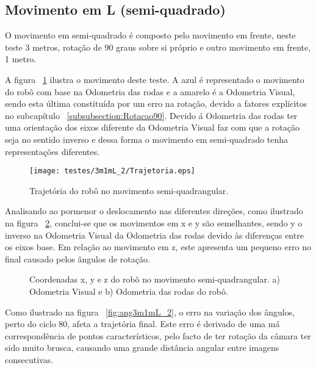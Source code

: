 \FloatBarrier
\subsection{Movimento em L (semi-quadrado)}\label{subsubsection:L}


O movimento em semi-quadrado é composto pelo movimento em frente, neste teste 3 metros, rotação de 90 graus sobre si próprio e outro movimento em frente, 1 metro.

A figura ~\ref{fig:trajRobo3m1mL_2} ilustra o movimento deste teste. A  azul é representado o movimento do robô com base na Odometria das rodas e a amarelo é a Odometria Visual, sendo esta última constituída por um erro na rotação, devido a fatores explícitos no subcapítulo ~\ref{subsubsection:Rotacao90}. Devido á Odometria das rodas ter uma orientação dos eixos diferente da Odometria Visual faz com que a rotação seja no sentido inverso e dessa forma o movimento em semi-quadrado tenha representações diferentes.

\pagebreak

\begin{figure}[h!]
	\begin{center}
		\leavevmode		
		\texttt{[image: testes/3m1mL\_2/Trajetoria.eps]}
		\caption{Trajetória do robô no movimento semi-quadrangular.}
		\label{fig:trajRobo3m1mL_2}
	\end{center}
\end{figure}



Analisando ao pormenor o deslocamento nas diferentes direções, como ilustrado na figura ~\ref{fig:pos3m1mL_2}, conclui-se que os movimentos em x e y são semelhantes, sendo y o inverso na Odometria Visual da Odometria das rodas devido às diferenças entre os eixos base. Em relação ao movimento em z, este apresenta um pequeno erro no final causado pelos ângulos de rotação.

\begin{figure}[h!]
	\centering
	\qquad
	\caption{Coordenadas x, y e z do robô  no movimento semi-quadrangular. a) Odometria Visual e b) Odometria das rodas do robô.}
	\label{fig:pos3m1mL_2}
\end{figure}


Como ilustrado na figura ~\ref{fig:ang3m1mL_2}, o erro na variação dos ângulos, perto do ciclo 80, afeta a trajetória final. Este erro é derivado de uma má correspondência de pontos característicos, pelo facto de ter rotação da câmara ter sido muito brusca, causando uma grande distância angular entre imagens consecutivas.


